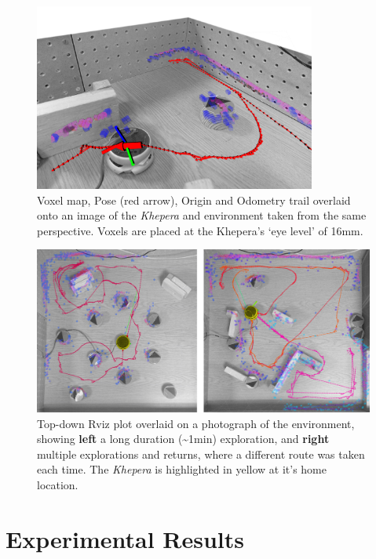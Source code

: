 \documentclass[11pt, a4paper]{article}
\begin{document}
\begin{figure}[H]
  \begin{center}
    \includegraphics[width=25em]{../assets/environments/success_2_detail_merged.png}
  \end{center}
  \caption{Voxel map, Pose (red arrow), Origin and Odometry trail overlaid onto an image of the \textit{Khepera} 
  and environment taken from the same perspective. Voxels are placed at the Khepera's `eye level' of 16mm.}
\end{figure}

\begin{figure}[H]
  \begin{center}
    \includegraphics[width=38em]{../assets/merged_top_fig.png}
  \end{center}
  \caption{Top-down Rviz plot overlaid on a photograph of the environment, showing \textbf{left}
    a long duration (\textasciitilde1min) exploration, and \textbf{right} multiple explorations 
    and returns, where a different route was taken each time. The \textit{Khepera} 
    is highlighted in yellow at it's home location.}
\end{figure}



\section{Experimental Results}
\label{Results}
\end{document}
